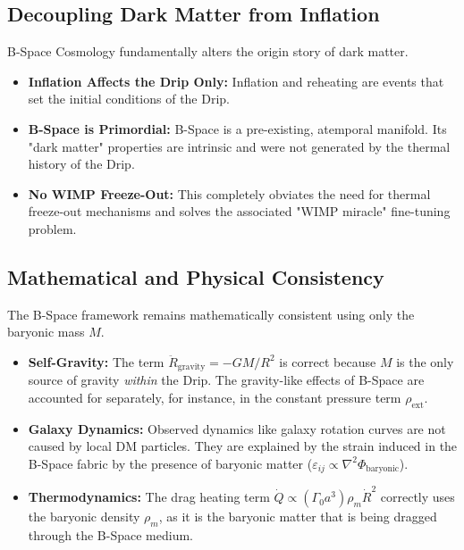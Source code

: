 \documentclass{BSpacePaper} %
\begin{document}
\begin{appendices}
\subsection{Decoupling Dark Matter from Inflation}
B-Space Cosmology fundamentally alters the origin story of dark matter.
\begin{itemize}
    \item \textbf{Inflation Affects the Drip Only:} Inflation and reheating are events that set the initial conditions of the Drip.
    \item \textbf{B-Space is Primordial:} B-Space is a pre-existing, atemporal manifold. Its "dark matter" properties are intrinsic and were not generated by the thermal history of the Drip.
    \item \textbf{No WIMP Freeze-Out:} This completely obviates the need for thermal freeze-out mechanisms and solves the associated "WIMP miracle" fine-tuning problem.
\end{itemize}

\subsection{Mathematical and Physical Consistency}
The B-Space framework remains mathematically consistent using only the baryonic mass $M$.
\begin{itemize}
    \item \textbf{Self-Gravity:} The term $\ddot{R}_{\text{gravity}}=-GM/R^2$ is correct because $M$ is the only source of gravity \textit{within} the Drip. The gravity-like effects of B-Space are accounted for separately, for instance, in the constant pressure term $\rho_{\text{ext}}$.
    \item \textbf{Galaxy Dynamics:} Observed dynamics like galaxy rotation curves are not caused by local DM particles. They are explained by the strain induced in the B-Space fabric by the presence of baryonic matter ($\varepsilon_{ij} \propto \nabla^2\Phi_{\text{baryonic}}$).
    \item \textbf{Thermodynamics:} The drag heating term $\dot{Q} \propto (\Gamma_0 a^3) \rho_m \dot{R}^2$ correctly uses the baryonic density $\rho_m$, as it is the baryonic matter that is being dragged through the B-Space medium.
\end{itemize}


\end{appendices}
\end{document}
